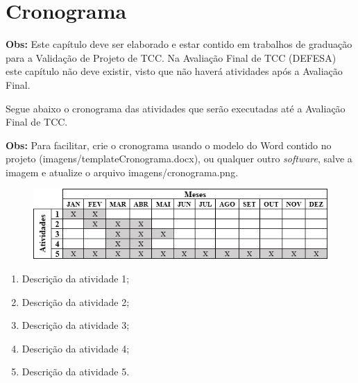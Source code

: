 \chapter{Cronograma}
\label{cap:06}

\textbf{Obs:} Este capítulo deve ser elaborado e estar contido em trabalhos de graduação para a Validação de Projeto de TCC. Na Avaliação Final de TCC (DEFESA) este capítulo não deve existir, visto que não haverá atividades após a Avaliação Final.

Segue abaixo o cronograma das atividades que serão executadas até a Avaliação Final de TCC.

\textbf{Obs:} Para facilitar, crie o cronograma usando o modelo do Word contido no projeto (imagens/templateCronograma.docx), ou qualquer outro \textit{software}, salve a imagem e atualize o arquivo imagens/cronograma.png.

\FloatBarrier
\begin{figure}[!htbp]
	\centering
	\includegraphics[scale=1]{imagens/cronograma}
\end{figure}
\FloatBarrier

\begin{enumerate}
	\item Descrição da atividade 1;
	\item Descrição da atividade 2;
	\item Descrição da atividade 3;
	\item Descrição da atividade 4;
	\item Descrição da atividade 5.
\end{enumerate}

